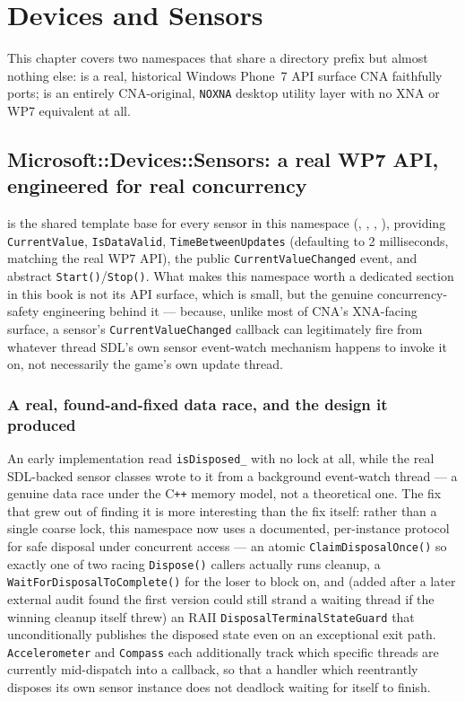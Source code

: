 \chapter{Devices and Sensors}
\label{ch:devices-sensors}

This chapter covers two namespaces that share a directory prefix but almost nothing else:
 is a real, historical Windows Phone~7 API surface CNA
faithfully ports;  is an entirely CNA-original, \texttt{NOXNA} desktop
utility layer with no XNA or WP7 equivalent at all.

\section{Microsoft::Devices::Sensors: a real WP7 API, engineered for real concurrency}

 is the shared template base for every sensor in this
namespace (, , ,
), providing \texttt{CurrentValue}, \texttt{IsDataValid},
\texttt{TimeBetweenUpdates} (defaulting to 2 milliseconds, matching the real WP7 API), the
public \texttt{CurrentValueChanged} event, and abstract \texttt{Start()}/\texttt{Stop()}.
What makes this namespace worth a dedicated section in this book is not its API surface,
which is small, but the genuine concurrency-safety engineering behind it --- because, unlike
most of CNA's XNA-facing surface, a sensor's \texttt{CurrentValueChanged} callback can
legitimately fire from whatever thread SDL's own sensor event-watch mechanism happens to
invoke it on, not necessarily the game's own update thread.

\subsection{A real, found-and-fixed data race, and the design it produced}

An early implementation read \texttt{isDisposed\_} with no lock at all, while the real
SDL-backed sensor classes wrote to it from a background event-watch thread --- a genuine
data race under the C\texttt{++} memory model, not a theoretical one. The fix that grew out
of finding it is more interesting than the fix itself: rather than a single coarse lock, this
namespace now uses a documented, per-instance protocol for safe disposal under concurrent
access --- an atomic \texttt{ClaimDisposalOnce()} so exactly one of two racing
\texttt{Dispose()} callers actually runs cleanup, a \texttt{WaitForDisposalToComplete()} for
the loser to block on, and (added after a later external audit found the first version could
still strand a waiting thread if the winning cleanup itself threw) an RAII
\texttt{DisposalTerminalStateGuard} that unconditionally publishes the disposed state even on
an exceptional exit path. \texttt{Accelerometer} and \texttt{Compass} each additionally track
which specific threads are currently mid-dispatch into a callback, so that a handler which
reentrantly disposes its own sensor instance does not deadlock waiting for itself to finish.

